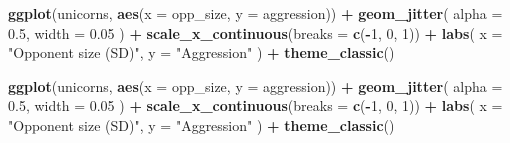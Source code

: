 \documentclass[
  12pt,
]{book}
\newenvironment{Shaded}{\begin{snugshade}}{\end{snugshade}}
\newcommand{\DataTypeTok}[1]{\textcolor[rgb]{0.13,0.29,0.53}{#1}}
\newcommand{\DecValTok}[1]{\textcolor[rgb]{0.00,0.00,0.81}{#1}}
\newcommand{\FloatTok}[1]{\textcolor[rgb]{0.00,0.00,0.81}{#1}}
\newcommand{\KeywordTok}[1]{\textcolor[rgb]{0.13,0.29,0.53}{\textbf{#1}}}
\newcommand{\NormalTok}[1]{#1}
\newcommand{\OperatorTok}[1]{\textcolor[rgb]{0.81,0.36,0.00}{\textbf{#1}}}
\newcommand{\StringTok}[1]{\textcolor[rgb]{0.31,0.60,0.02}{#1}}
\begin{document}
\begin{Shaded}
\begin{Highlighting}[]
\KeywordTok{ggplot}\NormalTok{(unicorns, }\KeywordTok{aes}\NormalTok{(}\DataTypeTok{x =}\NormalTok{ opp\_size, }\DataTypeTok{y =}\NormalTok{ aggression)) }\OperatorTok{+}
\StringTok{  }\KeywordTok{geom\_jitter}\NormalTok{(}
    \DataTypeTok{alpha =} \FloatTok{0.5}\NormalTok{,}
    \DataTypeTok{width =} \FloatTok{0.05}
\NormalTok{  ) }\OperatorTok{+}
\StringTok{  }\KeywordTok{scale\_x\_continuous}\NormalTok{(}\DataTypeTok{breaks =} \KeywordTok{c}\NormalTok{(}\OperatorTok{{-}}\DecValTok{1}\NormalTok{, }\DecValTok{0}\NormalTok{, }\DecValTok{1}\NormalTok{)) }\OperatorTok{+}
\StringTok{  }\KeywordTok{labs}\NormalTok{(}
    \DataTypeTok{x =} \StringTok{"Opponent size (SD)"}\NormalTok{,}
    \DataTypeTok{y =} \StringTok{"Aggression"}
\NormalTok{  ) }\OperatorTok{+}
\StringTok{  }\KeywordTok{theme\_classic}\NormalTok{()}
\end{Highlighting}
\end{Shaded}

\begin{Shaded}
\begin{Highlighting}[]
\KeywordTok{ggplot}\NormalTok{(unicorns, }\KeywordTok{aes}\NormalTok{(}\DataTypeTok{x =}\NormalTok{ opp\_size, }\DataTypeTok{y =}\NormalTok{ aggression)) }\OperatorTok{+}
\StringTok{  }\KeywordTok{geom\_jitter}\NormalTok{(}
    \DataTypeTok{alpha =} \FloatTok{0.5}\NormalTok{,}
    \DataTypeTok{width =} \FloatTok{0.05}
\NormalTok{  ) }\OperatorTok{+}
\StringTok{  }\KeywordTok{scale\_x\_continuous}\NormalTok{(}\DataTypeTok{breaks =} \KeywordTok{c}\NormalTok{(}\OperatorTok{{-}}\DecValTok{1}\NormalTok{, }\DecValTok{0}\NormalTok{, }\DecValTok{1}\NormalTok{)) }\OperatorTok{+}
\StringTok{  }\KeywordTok{labs}\NormalTok{(}
    \DataTypeTok{x =} \StringTok{"Opponent size (SD)"}\NormalTok{,}
    \DataTypeTok{y =} \StringTok{"Aggression"}
\NormalTok{  ) }\OperatorTok{+}
\StringTok{  }\KeywordTok{theme\_classic}\NormalTok{()}
\end{Highlighting}
\end{Shaded}
\end{document}
